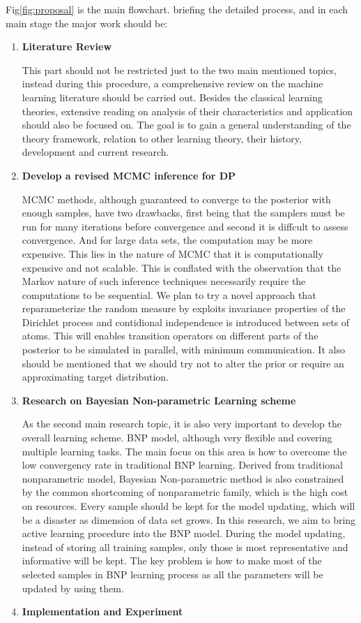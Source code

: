 \documentclass[a4paper,14pt]{article}
\begin{document}
Fig\ref{fig:proposal} is the main flowchart.  briefing the detailed process, and in each main stage the major work should be:
\begin{enumerate}
	\item \textbf{Literature Review}
	
	This part should not be restricted just to the two main mentioned topics, instead during this procedure, a comprehensive review on the machine learning literature should be carried out. Besides the classical learning theories, extensive reading on analysis of their characteristics and application should also be focused on. The goal is to gain a general understanding of the theory framework, relation to other learning theory,  their history, development and current research. 
	
	\item \textbf{Develop a revised MCMC inference for DP}
	
	MCMC methods, although guaranteed to converge to the posterior with enough samples, have two drawbacks, first being that the samplers must be run for many iterations before convergence and second it is diffcult to assess convergence. And for large data sets, the computation may be more expensive. This lies in the nature of MCMC that it is computationally expensive and not scalable\cite{Neal2000}. This is conflated with the observation that the Markov nature of such inference techniques necessarily require the computations to be sequential. We plan to try a novel approach that reparameterize the random measure by exploits invariance properties of the Dirichlet process and contidional independence is introduced between sets of atoms. This will enables transition operators on different parts of the posterior to be simulated in parallel, with minimum communication. It also should be mentioned that we should try not to alter the prior or require an approximating target distribution.
	
	\item \textbf{Research on Bayesian Non-parametric Learning scheme}
	
	As the second main research topic, it is also very important to develop the overall learning scheme. BNP model, although very flexible and covering multiple learning tasks. The main focus on this area is how to overcome the low convergency rate in traditional BNP learning. Derived from traditional nonparametric model, Bayesian Non-parametric method is also constrained by the common shortcoming of nonparametric family, which is the high cost on resources\cite{ghosh1982nonparametric,vapnik1998statistical}. Every sample should be kept for the model updating, which will be a disaster as dimension of data set grows. In this research, we aim to bring active learning procedure into the BNP model. During the model updating, instead of storing all training samples, only those is most representative and informative will be kept. The key problem is how to make most of the selected samples in BNP learning process as all the parameters will be updated by using them.  
	\item \textbf{Implementation and Experiment}
	

\end{enumerate}
\end{document}
